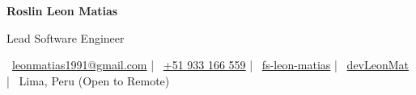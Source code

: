 
\begin{center}
  {\LARGE\bfseries\color{primarydark} Roslin Leon Matias}

  \vspace{2pt}

  {\large\color{primary} Lead Software Engineer}

  \vspace{6pt}

  \small
  ~\href{mailto:leonmatias1991@gmail.com}{leonmatias1991@gmail.com}
  \hspace{6pt}|\hspace{6pt}
  ~\href{https://wa.me/51933166559}{+51 933 166 559}
  \hspace{6pt}|\hspace{6pt}
  ~\href{https://www.linkedin.com/in/fs-leon-matias/}{fs-leon-matias}
  \hspace{6pt}|\hspace{6pt}
  ~\href{https://github.com/devLeonMat}{devLeonMat}
  \hspace{6pt}|\hspace{6pt}
  ~Lima, Peru (Open to Remote)
\end{center}
